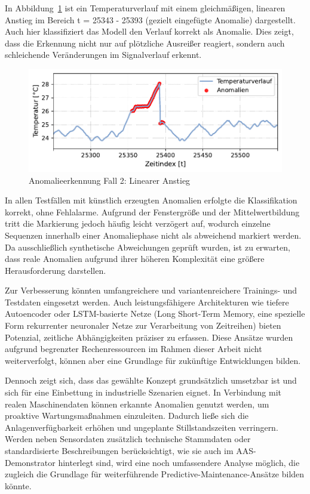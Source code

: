 In Abbildung~\ref{fig:Fall2} ist ein Temperaturverlauf mit einem gleichmäßigen, linearen Anstieg im Bereich t = 25343 - 25393 (gezielt eingefügte Anomalie) dargestellt. 
Auch hier klassifiziert das Modell den Verlauf korrekt als Anomalie. 
Dies zeigt, dass die Erkennung nicht nur auf plötzliche Ausreißer reagiert, sondern auch schleichende Veränderungen im Signalverlauf erkennt.


\begin{figure}[htbp]
    \centering
        \includegraphics[width=1\textwidth]{Bilder/Ergebnisse/KI/Fall2.pdf}
        \vspace{-2em}
    \caption{Anomalieerkennung Fall 2: Linearer Anstieg}
    \label{fig:Fall2}
\end{figure}
\vspace{-0.5em}

In allen Testfällen mit künstlich erzeugten Anomalien erfolgte die Klassifikation korrekt, ohne Fehlalarme. 
Aufgrund der Fenstergröße und der Mittelwertbildung tritt die Markierung jedoch häufig leicht verzögert auf, wodurch einzelne Sequenzen innerhalb einer Anomaliephase nicht als abweichend markiert werden. 
Da ausschließlich synthetische Abweichungen geprüft wurden, ist zu erwarten, dass reale Anomalien aufgrund ihrer höheren Komplexität eine größere Herausforderung darstellen.

Zur Verbesserung könnten umfangreichere und variantenreichere Trainings- und Testdaten eingesetzt werden. 
Auch leistungsfähigere Architekturen wie tiefere Autoencoder oder LSTM-basierte Netze (Long Short-Term Memory, eine spezielle Form rekurrenter neuronaler Netze zur Verarbeitung von Zeitreihen) bieten Potenzial, zeitliche Abhängigkeiten präziser zu erfassen.
Diese Ansätze wurden aufgrund begrenzter Rechenressourcen im Rahmen dieser Arbeit nicht weiterverfolgt, können aber eine Grundlage für zukünftige Entwicklungen bilden.

Dennoch zeigt sich, dass das gewählte Konzept grundsätzlich umsetzbar ist und sich für eine Einbettung in industrielle Szenarien eignet. 
In Verbindung mit realen Maschinendaten können erkannte Anomalien genutzt werden, um proaktive Wartungsmaßnahmen einzuleiten. 
Dadurch ließe sich die Anlagenverfügbarkeit erhöhen und ungeplante Stillstandszeiten verringern.
Werden neben Sensordaten zusätzlich technische Stammdaten oder standardisierte Beschreibungen berücksichtigt, wie sie auch im AAS-Demonstrator hinterlegt sind, wird eine noch umfassendere Analyse möglich, die zugleich die Grundlage für weiterführende Predictive-Maintenance-Ansätze bilden könnte.


